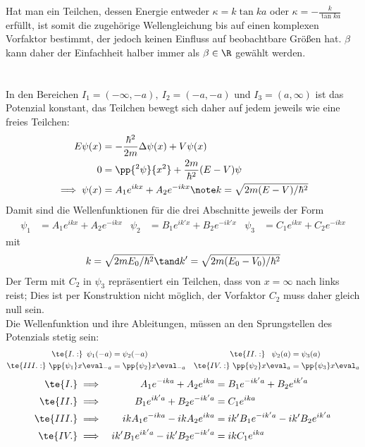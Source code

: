 \documentclass[ex]{exercise_3.0}
\begin{document}
Hat man ein Teilchen, dessen Energie entweder \(\kappa = k \tan ka\) oder \(\kappa = -\frac k {\tan ka}\) erfüllt,
ist somit die zugehörige Wellengleichung bis auf einen komplexen Vorfaktor bestimmt, der jedoch keinen Einfluss
auf beobachtbare Größen hat. \(\beta\) kann daher der Einfachheit halber immer als \(\beta\in\R\) gewählt werden.

\section{}
In den Bereichen \(I_1 = (-\infty,-a), \ I_2 = (-a,-a)\) und \(I_3 = (a, \infty)\) ist das Potenzial konstant,
das Teilchen bewegt sich daher auf jedem jeweils wie eine freies Teilchen:
\begin{align*}
    E\psi(x) &= -\frac{\hbar ^2}{2m} \Delta \psi (x) + V\psi(x)\\
    0 &= \pp{^2\psi}{x^2} + \frac{2m}{\hbar ^2}(E-V) \psi\\
    \implies \psi(x) &= A_1 e^{i k x } + A_2 e^{-i k x } \note k = \sqrt{2m(E-V)/\hbar ^2}
\end{align*}
Damit sind die Wellenfunktionen für die drei Abschnitte jeweils der Form
\begin{align*}
    \psi_1 &= A_1 e^{i k x } + A_2 e^{-i k x }&
    \psi_2 &= B_1 e^{i k' x } + B_2 e^{-i k' x}&
    \psi_3 &= C_1 e^{i k x } + C_2 e^{-i k x }
\end{align*}
mit 
\begin{align*}
    k = \sqrt{2m E_0 /\hbar^2} \tand
    k' = \sqrt{2m (E_0 -V_0) /\hbar^2}
\end{align*}
Der Term mit \(C_2\) in \(\psi_3\) repräsentiert ein Teilchen, dass von \(x=\infty\) nach links reist; Dies 
ist per Konstruktion nicht möglich, der Vorfaktor \(C_2\) muss daher gleich null sein.\\[1ex]
Die Wellenfunktion und ihre Ableitungen, müssen an den Sprungstellen des Potenzials stetig sein:
\begin{align*}
    \te{I.:}\ \,\psi_1(-a) &= \psi_2(-a) & \te{II.:}\ \ \,\psi_2(a) &= \psi_3(a)\\
    \te{III.:}\ \pp{\psi_1}x\eval_{-a} &= \pp{\psi_2}x\eval_{-a} & \te{IV.:}\ \pp{\psi_2}x\eval_{a} &= \pp{\psi_3}x\eval_{a}
\end{align*}
\begin{align*}
    \te{I.} &\implies &A_1 e^{-i k a} + A_2 e^{i k a} 
    &= B_1 e^{- i k' a} + B_2 e^{i k' a}
    \\
    \te{II.} &\implies& B_1 e^{i k' a} + B_2 e^{-i k' a} 
    &= C_1 e^{i k a}
    \\ 
    \te{III.} &\implies& i k A_1 e^{-i k a} - i k A_2 e^{i k a} 
    &= i k' B_1 e^{- i k' a} - i k' B_2 e^{i k' a}
    \\
    \te{IV.} &\implies& i k' B_1 e^{i k' a} - i k' B_2 e^{-i k' a} 
    &= i k C_1 e^{i k a} 
\end{align*}
\end{document}
